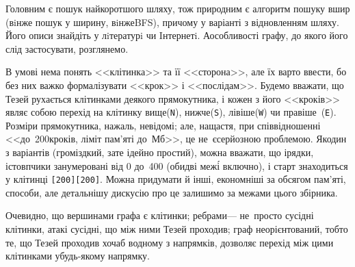 \Tutorial	Головним є пошук найкоротшого шляху, тож природним є
алгоритм пошуку вшир (вiн\nolinebreak[3] же пошук у ширину, вiн\nolinebreak[3] же\nolinebreak[3] BFS), причому у варіанті з відновленням шляху. Його описи знайдіть у лiтературi чи Iнтернетi.
А\nolinebreak[3] особливості графу, до якого його слід застосувати, розглянемо.

В умові нема понять <<клітинка>> та її <<сторона>>, але їх варто ввести, бо без них важко формалізувати <<крок>> і <<по\nolinebreak[3] слідам>>. Будемо вважати, що Тезей рухається клітинками деякого прямокутника, і кожен з його <<кроків>> являє собою перехід на клітинку вище\nolinebreak[3] (\texttt{N}), нижче\nolinebreak[3] (\texttt{S}), лівіше\nolinebreak[3] (\texttt{W}) чи правіше~(\texttt{E}). Розміри прямокутника, на\nolinebreak[2] жаль, невідомі; але, на\nolinebreak[2] щастя, при співвідношенні <<до~200\nolinebreak[3] кроків, ліміт пам'яті до~Мб>>, це не~є\nolinebreak[2] серйозною проблемою. Як\nolinebreak[3] один з варіантів (громіздкий, зате ідейно простий), можна вважати, що і\nolinebreak[3] рядки, і\nolinebreak[3] стовпчики занумеровані від 0 до~400 (обидві меж\'{і} включно), і старт знаходиться у клітинці \texttt{[200][200]}. Можна придумати й інші, економніші за обсягом пам'яті, способи, але детальнішу дискусію про це залишимо за межами цього збірника.

Очевидно, що вершинами графа є клітинки; ребрами\nolinebreak[3] --- не~просто сусідні клітинки, а\nolinebreak[2] такі сусідні, що між ними Тезей проходив; граф неорієнтований, тобто те, що Тезей проходив хоча\nolinebreak[3] б в\nolinebreak[2] одному з напрямків, дозволяє перехід між цими клітинками у\nolinebreak[2] будь-якому напрямку. 

